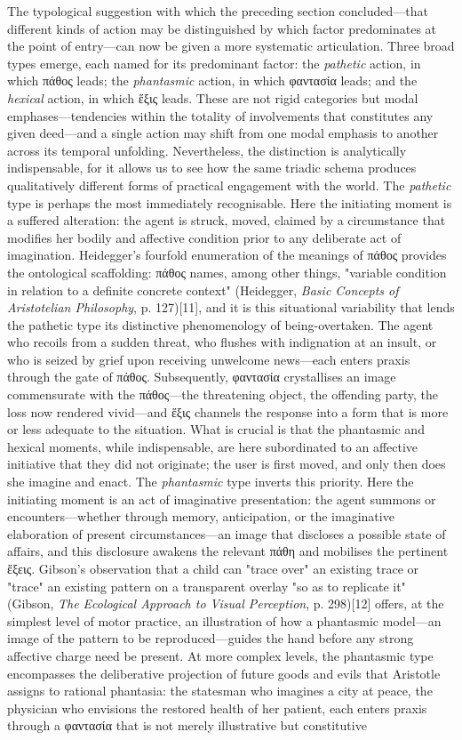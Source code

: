 \documentclass{article}
\begin{document}
The typological suggestion with which the preceding section concluded—that different kinds of action may be distinguished by which factor predominates at the point of entry—can now be given a more systematic articulation. Three broad types emerge, each named for its predominant factor: the \textit{pathetic} action, in which πάθος leads; the \textit{phantasmic} action, in which φαντασία leads; and the \textit{hexical} action, in which ἕξις leads. These are not rigid categories but modal emphases—tendencies within the totality of involvements that constitutes any given deed—and a single action may shift from one modal emphasis to another across its temporal unfolding. Nevertheless, the distinction is analytically indispensable, for it allows us to see how the same triadic schema produces qualitatively different forms of practical engagement with the world. The \textit{pathetic} type is perhaps the most immediately recognisable. Here the initiating moment is a suffered alteration: the agent is struck, moved, claimed by a circumstance that modifies her bodily and affective condition prior to any deliberate act of imagination. Heidegger's fourfold enumeration of the meanings of πάθος provides the ontological scaffolding: πάθος names, among other things, "variable condition in relation to a definite concrete context" (Heidegger, \textit{Basic Concepts of Aristotelian Philosophy}, p. 127)[11], and it is this situational variability that lends the pathetic type its distinctive phenomenology of being-overtaken. The agent who recoils from a sudden threat, who flushes with indignation at an insult, or who is seized by grief upon receiving unwelcome news—each enters praxis through the gate of πάθος. Subsequently, φαντασία crystallises an image commensurate with the πάθος—the threatening object, the offending party, the loss now rendered vivid—and ἕξις channels the response into a form that is more or less adequate to the situation. What is crucial is that the phantasmic and hexical moments, while indispensable, are here subordinated to an affective initiative that they did not originate; the user is first moved, and only then does she imagine and enact. The \textit{phantasmic} type inverts this priority. Here the initiating moment is an act of imaginative presentation: the agent summons or encounters—whether through memory, anticipation, or the imaginative elaboration of present circumstances—an image that discloses a possible state of affairs, and this disclosure awakens the relevant πάθη and mobilises the pertinent ἕξεις. Gibson's observation that a child can "trace over" an existing trace or "trace" an existing pattern on a transparent overlay "so as to replicate it" (Gibson, \textit{The Ecological Approach to Visual Perception}, p. 298)[12] offers, at the simplest level of motor practice, an illustration of how a phantasmic model—an image of the pattern to be reproduced—guides the hand before any strong affective charge need be present. At more complex levels, the phantasmic type encompasses the deliberative projection of future goods and evils that Aristotle assigns to rational phantasia: the statesman who imagines a city at peace, the physician who envisions the restored health of her patient, each enters praxis through a φαντασία that is not merely illustrative but constitutive 
\end{document}
